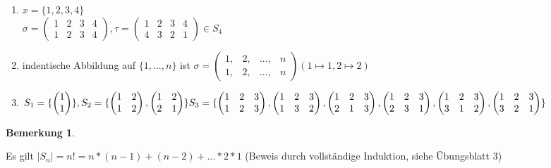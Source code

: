 \documentclass[a4paper,11pt]{article}
\newtheorem{bem}[definition]{Bemerkung}
\begin{document}
\begin{enumerate}[label=\alph*)]
\item $x=\{1,2,3,4\}$ \\
$\sigma = \begin{pmatrix}1&2&3&4 \\ 1&2&3&4\end{pmatrix}, \tau = \begin{pmatrix}1&2&3&4 \\ 4&3&2&1\end{pmatrix}\in S_4$
\item indentische Abbildung auf $\{1,...,n\}$ ist $\sigma=\begin{pmatrix}1,&2,&...,&n \\ 1,&2,&...,&n \end{pmatrix} (1\mapsto 1, 2\mapsto 2)$
\item $S_1=\{\begin{pmatrix}1\\1\end{pmatrix}\}, S_2=\{\begin{pmatrix}1&2\\1&2\end{pmatrix},\begin{pmatrix}1&2\\2&1\end{pmatrix}\} \\
S_3=\{\begin{pmatrix}1&2&3\\1&2&3\end{pmatrix},\begin{pmatrix}1&2&3\\1&3&2\end{pmatrix},\begin{pmatrix}1&2&3\\2&1&3\end{pmatrix},\begin{pmatrix}1&2&3\\2&3&1\end{pmatrix},\begin{pmatrix}1&2&3\\3&1&2\end{pmatrix},\begin{pmatrix}1&2&3\\3&2&1\end{pmatrix}\}$
\end{enumerate}
\newpage
\begin{bem}
\end{bem}
Es gilt $\vert S_n\vert=n!=n*(n-1)+(n-2)+...*2*1$ (Beweis durch vollständige Induktion, siehe Übungsblatt 3)
\end{document}
